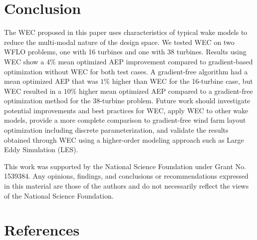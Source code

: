 \documentclass[a4paper]{jpconf}
\begin{document}
\section{Conclusion}
The WEC proposed in this paper uses characteristics of typical wake models to reduce the multi-modal nature of the design space. We tested WEC on two WFLO problems, one with 16 turbines and one with 38 turbines. Results using WEC show a $4\%$ mean optimized AEP improvement compared to gradient-based optimization without WEC for both test cases. A gradient-free algorithm had a mean optimized AEP that was $1\%$ higher than WEC for the 16-turbine case, but WEC resulted in a $10\%$ higher mean optimized AEP compared to a gradient-free optimization method for the 38-turbine problem. Future work should investigate potential improvements and best practices for WEC, apply WEC to other wake models, provide a more complete comparison to gradient-free wind farm layout optimization including discrete parameterization, and validate the results obtained through WEC using a higher-order modeling approach such as Large Eddy Simulation (LES). 

\ack 
This work was supported by the National Science Foundation under Grant No. 1539384. Any opinions, findings, and conclusions or recommendations expressed in this material are those of the authors and do not necessarily reflect the views of the National Science Foundation.

\section*{References}


\end{document}

